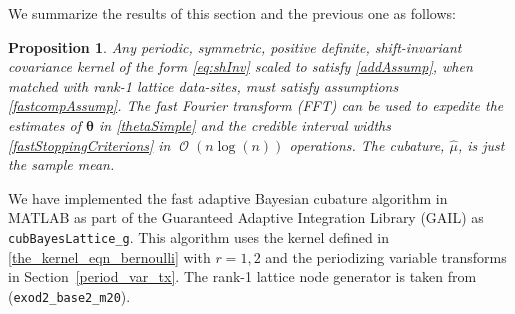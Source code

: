 \documentclass[twocolumn]{svjour3}          %
\DeclareMathOperator{\Order}{{\mathcal O}}
\newtheorem{prop}{Proposition}
\newcommand{\bm}[1]{\boldsymbol{#1}}
\newcommand{\rlambda}{\mathring{\lambda}}
\newcommand{\vtheta}{{\bm{\theta}}}
\newcommand{\hmu}{\widehat{\mu}}
\newcommand{\MLE}{\textup{MLE}}
\newcommand{\GCV}{\textup{GCV}}
\newcommand{\err}{\textup{err}}
\newcommand{\code}[1]{\texttt{#1}}
\def\abs#1{\ensuremath{\left \lvert #1 \right \rvert}}
\newcommand\secref{Section~\ref}
\begin{document}

We summarize the results of this section and the previous one as follows:
\begin{prop}
Any periodic, symmetric, positive definite, shift-invariant covariance kernel of the form \eqref{eq:shInv} scaled to satisfy \eqref{addAssump}, when matched with rank-1 lattice data-sites, must satisfy assumptions \eqref{fastcompAssump}.  The \emph{fast Fourier transform} (FFT) can be used to expedite the estimates of $\vtheta$ in \eqref{thetaSimple} and the credible interval widths \eqref{fastStoppingCriterions} in $\Order(n \log(n))$ operations. The cubature, $\hmu$, is just the sample mean.
\end{prop}

We have implemented the fast adaptive Bayesian cubature algorithm in MATLAB as part of the Guaranteed Adaptive Integration Library (GAIL) \cite{ChoEtal17b} as \allowbreak \code{cubBayesLattice\_g}. This algorithm uses the kernel defined in  \eqref{the_kernel_eqn_bernoulli} with  $r=1,2$ and the periodizing variable transforms in  \secref{period_var_tx}.  The rank-1 lattice node generator is taken from \cite{Nuy17a} (\code{exod2\_base2\_m20}).
\end{document}

